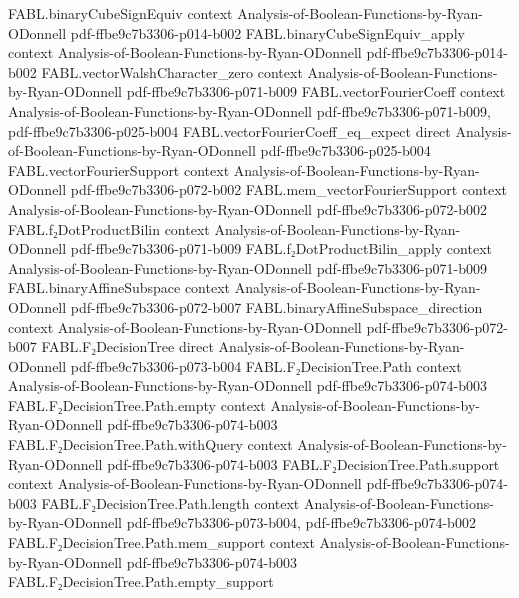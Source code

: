 \begin{theorem}
\proofstep
  {FABL.binaryCubeSignEquiv}
  {context}
  {Analysis-of-Boolean-Functions-by-Ryan-ODonnell}
  {pdf-ffbe9c7b3306-p014-b002}
\proofstep
  {FABL.binaryCubeSignEquiv_apply}
  {context}
  {Analysis-of-Boolean-Functions-by-Ryan-ODonnell}
  {pdf-ffbe9c7b3306-p014-b002}
\proofstep
  {FABL.vectorWalshCharacter_zero}
  {context}
  {Analysis-of-Boolean-Functions-by-Ryan-ODonnell}
  {pdf-ffbe9c7b3306-p071-b009}
\proofstep
  {FABL.vectorFourierCoeff}
  {context}
  {Analysis-of-Boolean-Functions-by-Ryan-ODonnell}
  {pdf-ffbe9c7b3306-p071-b009,
    pdf-ffbe9c7b3306-p025-b004}
\proofstep
  {FABL.vectorFourierCoeff_eq_expect}
  {direct}
  {Analysis-of-Boolean-Functions-by-Ryan-ODonnell}
  {pdf-ffbe9c7b3306-p025-b004}
\proofstep
  {FABL.vectorFourierSupport}
  {context}
  {Analysis-of-Boolean-Functions-by-Ryan-ODonnell}
  {pdf-ffbe9c7b3306-p072-b002}
\proofstep
  {FABL.mem_vectorFourierSupport}
  {context}
  {Analysis-of-Boolean-Functions-by-Ryan-ODonnell}
  {pdf-ffbe9c7b3306-p072-b002}
\proofstep
  {FABL.f₂DotProductBilin}
  {context}
  {Analysis-of-Boolean-Functions-by-Ryan-ODonnell}
  {pdf-ffbe9c7b3306-p071-b009}
\proofstep
  {FABL.f₂DotProductBilin_apply}
  {context}
  {Analysis-of-Boolean-Functions-by-Ryan-ODonnell}
  {pdf-ffbe9c7b3306-p071-b009}
\proofstep
  {FABL.binaryAffineSubspace}
  {context}
  {Analysis-of-Boolean-Functions-by-Ryan-ODonnell}
  {pdf-ffbe9c7b3306-p072-b007}
\proofstep
  {FABL.binaryAffineSubspace_direction}
  {context}
  {Analysis-of-Boolean-Functions-by-Ryan-ODonnell}
  {pdf-ffbe9c7b3306-p072-b007}
\proofstep
  {FABL.F₂DecisionTree}
  {direct}
  {Analysis-of-Boolean-Functions-by-Ryan-ODonnell}
  {pdf-ffbe9c7b3306-p073-b004}
\proofstep
  {FABL.F₂DecisionTree.Path}
  {context}
  {Analysis-of-Boolean-Functions-by-Ryan-ODonnell}
  {pdf-ffbe9c7b3306-p074-b003}
\proofstep
  {FABL.F₂DecisionTree.Path.empty}
  {context}
  {Analysis-of-Boolean-Functions-by-Ryan-ODonnell}
  {pdf-ffbe9c7b3306-p074-b003}
\proofstep
  {FABL.F₂DecisionTree.Path.withQuery}
  {context}
  {Analysis-of-Boolean-Functions-by-Ryan-ODonnell}
  {pdf-ffbe9c7b3306-p074-b003}
\proofstep
  {FABL.F₂DecisionTree.Path.support}
  {context}
  {Analysis-of-Boolean-Functions-by-Ryan-ODonnell}
  {pdf-ffbe9c7b3306-p074-b003}
\proofstep
  {FABL.F₂DecisionTree.Path.length}
  {context}
  {Analysis-of-Boolean-Functions-by-Ryan-ODonnell}
  {pdf-ffbe9c7b3306-p073-b004,
    pdf-ffbe9c7b3306-p074-b002}
\proofstep
  {FABL.F₂DecisionTree.Path.mem_support}
  {context}
  {Analysis-of-Boolean-Functions-by-Ryan-ODonnell}
  {pdf-ffbe9c7b3306-p074-b003}
\proofstep
  {FABL.F₂DecisionTree.Path.empty_support}

\end{theorem}
